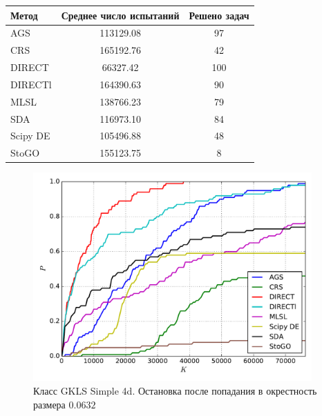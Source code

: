 \documentclass[a4paper]{article}
\begin{document}
\begin{tabular}{lcc}
\hline
 Метод    &  Среднее число испытаний  &  Решено задач  \\
\hline
 AGS      &         113129.08         &       97       \\
 CRS      &         165192.76         &       42       \\
 DIRECT   &         66327.42          &      100       \\
 DIRECTl  &         164390.63         &       90       \\
 MLSL     &         138766.23         &       79       \\
 SDA      &         116973.10         &       84       \\
 Scipy DE &         105496.88         &       48       \\
 StoGO    &         155123.75         &       8        \\
\hline
\end{tabular}
\begin{figure}[H]
  \center
  \includegraphics[width=0.95\textwidth]{../experiments/gklss4d/cmc.pdf}
  \caption{Класс GKLS Simple 4d. Остановка после попадания в окрестность размера $0.0632$}
  \label{fig:}
\end{figure}
\end{document}
